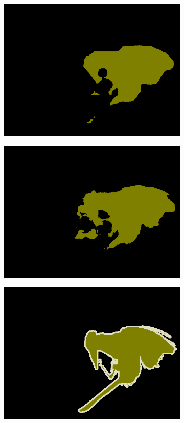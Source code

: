 \documentclass{article} %
\begin{document}
\begin{figure}[t]
\begin{subfigure}[b]{0.19\linewidth}
    \includegraphics[width=\textwidth]{figs/ab/context/2008_007498}
  \end{subfigure}
  \begin{subfigure}[b]{0.19\linewidth}
    \includegraphics[width=\textwidth]{figs/ab/crf/2008_007498}
  \end{subfigure}
  \begin{subfigure}[b]{0.19\linewidth}
    \includegraphics[width=\textwidth]{figs/ab/gt/2008_007498}

\end{subfigure}
\end{figure}
\end{document}

